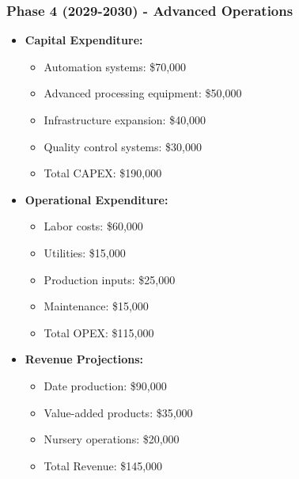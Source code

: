\subsubsection{Phase 4 (2029-2030) - Advanced Operations}
\begin{itemize}
    \item \textbf{Capital Expenditure:}
    \begin{itemize}
        \item Automation systems: \$70,000
        \item Advanced processing equipment: \$50,000
        \item Infrastructure expansion: \$40,000
        \item Quality control systems: \$30,000
        \item Total CAPEX: \$190,000
    \end{itemize}
    \item \textbf{Operational Expenditure:}
    \begin{itemize}
        \item Labor costs: \$60,000
        \item Utilities: \$15,000
        \item Production inputs: \$25,000
        \item Maintenance: \$15,000
        \item Total OPEX: \$115,000
    \end{itemize}
    \item \textbf{Revenue Projections:}
    \begin{itemize}
        \item Date production: \$90,000
        \item Value-added products: \$35,000
        \item Nursery operations: \$20,000
        \item Total Revenue: \$145,000
    \end{itemize}
\end{itemize}

